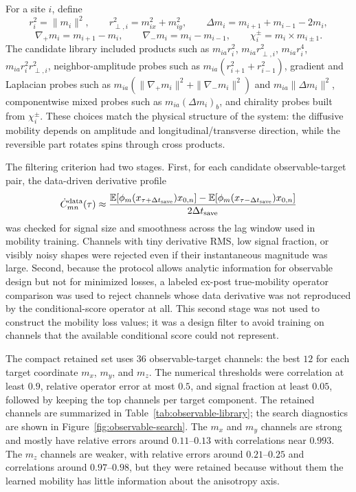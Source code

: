 \documentclass[11pt]{article}
\newcommand{\E}{\mathbb{E}}
\begin{document}
For a site $i$, define
\[
  r_i^2=\|m_i\|^2,\qquad
  r_{\perp,i}^2=m_{ix}^2+m_{iy}^2,\qquad
  \Delta m_i=m_{i+1}+m_{i-1}-2m_i,
\]
\[
  \nabla_+m_i=m_{i+1}-m_i,\qquad
  \nabla_-m_i=m_i-m_{i-1},\qquad
  \chi_i^\pm=m_i\times m_{i\pm1}.
\]
The candidate library included products such as
$m_{ia}r_i^2$, $m_{ia}r_{\perp,i}^2$, $m_{ia}r_i^4$,
$m_{ia}r_i^2r_{\perp,i}^2$, neighbor-amplitude probes such as
$m_{ia}(r_{i+1}^2+r_{i-1}^2)$, gradient and Laplacian probes such as
$m_{ia}(\|\nabla_+m_i\|^2+\|\nabla_-m_i\|^2)$ and
$m_{ia}\|\Delta m_i\|^2$, componentwise mixed probes such as
$m_{ia}(\Delta m_i)_b$, and chirality probes built from
$\chi_i^\pm$.  These choices match the physical structure of the system: the
diffusive mobility depends on amplitude and longitudinal/transverse direction,
while the reversible part rotates spins through cross products.

The filtering criterion had two stages.  First, for each candidate
observable-target pair, the data-driven derivative profile
\[
  \dot C_{mn}^{\rm data}(\tau)
  \approx
  \frac{\E[\phi_m(x_{\tau+\Delta t_{\rm save}})x_{0,n}]
        -\E[\phi_m(x_{\tau-\Delta t_{\rm save}})x_{0,n}]}
       {2\Delta t_{\rm save}}
\]
was checked for signal size and smoothness across the lag window used in
mobility training.  Channels with tiny derivative RMS, low signal fraction, or
visibly noisy shapes were rejected even if their instantaneous magnitude was
large.  Second, because the protocol allows analytic information for observable
design but not for minimized losses, a labeled ex-post true-mobility operator
comparison was used to reject channels whose data derivative was not reproduced
by the conditional-score operator at all.  This second stage was not used to
construct the mobility loss values; it was a design filter to avoid training on
channels that the available conditional score could not represent.

The compact retained set uses $36$ observable-target channels: the best $12$
for each target coordinate $m_x$, $m_y$, and $m_z$.  The numerical thresholds
were correlation at least $0.9$, relative operator error at most $0.5$, and
signal fraction at least $0.05$, followed by keeping the top channels per target
component.  The retained channels are summarized in
Table~\ref{tab:observable-library}; the search diagnostics are shown in
Figure~\ref{fig:observable-search}.  The $m_x$ and $m_y$ channels are strong
and mostly have relative errors around $0.11$--$0.13$ with correlations near
$0.993$.  The $m_z$ channels are weaker, with relative errors around
$0.21$--$0.25$ and correlations around $0.97$--$0.98$, but they were retained
because without them the learned mobility has little information about the
anisotropy axis.
\end{document}
